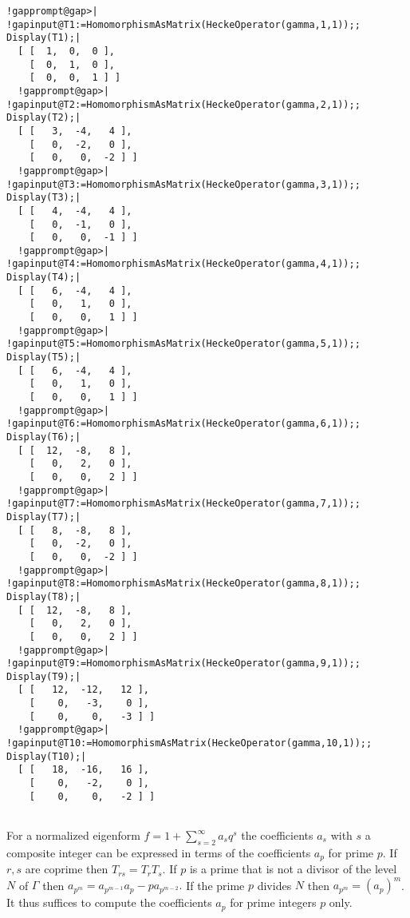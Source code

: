 \documentclass[a4paper,11pt]{report}
\begin{document}
{{\begin{Verbatim}[commandchars=!@|,fontsize=\small,frame=single,label=Example]
  !gapprompt@gap>| !gapinput@T1:=HomomorphismAsMatrix(HeckeOperator(gamma,1,1));; Display(T1);|
  [ [  1,  0,  0 ],
    [  0,  1,  0 ],
    [  0,  0,  1 ] ]
  !gapprompt@gap>| !gapinput@T2:=HomomorphismAsMatrix(HeckeOperator(gamma,2,1));; Display(T2);|
  [ [   3,  -4,   4 ],
    [   0,  -2,   0 ],
    [   0,   0,  -2 ] ]
  !gapprompt@gap>| !gapinput@T3:=HomomorphismAsMatrix(HeckeOperator(gamma,3,1));; Display(T3);|
  [ [   4,  -4,   4 ],
    [   0,  -1,   0 ],
    [   0,   0,  -1 ] ]
  !gapprompt@gap>| !gapinput@T4:=HomomorphismAsMatrix(HeckeOperator(gamma,4,1));; Display(T4);|
  [ [   6,  -4,   4 ],
    [   0,   1,   0 ],
    [   0,   0,   1 ] ]
  !gapprompt@gap>| !gapinput@T5:=HomomorphismAsMatrix(HeckeOperator(gamma,5,1));; Display(T5);|
  [ [   6,  -4,   4 ],
    [   0,   1,   0 ],
    [   0,   0,   1 ] ]
  !gapprompt@gap>| !gapinput@T6:=HomomorphismAsMatrix(HeckeOperator(gamma,6,1));; Display(T6);|
  [ [  12,  -8,   8 ],
    [   0,   2,   0 ],
    [   0,   0,   2 ] ]
  !gapprompt@gap>| !gapinput@T7:=HomomorphismAsMatrix(HeckeOperator(gamma,7,1));; Display(T7);|
  [ [   8,  -8,   8 ],
    [   0,  -2,   0 ],
    [   0,   0,  -2 ] ]
  !gapprompt@gap>| !gapinput@T8:=HomomorphismAsMatrix(HeckeOperator(gamma,8,1));; Display(T8);|
  [ [  12,  -8,   8 ],
    [   0,   2,   0 ],
    [   0,   0,   2 ] ]
  !gapprompt@gap>| !gapinput@T9:=HomomorphismAsMatrix(HeckeOperator(gamma,9,1));; Display(T9);|
  [ [   12,  -12,   12 ],
    [    0,   -3,    0 ],
    [    0,    0,   -3 ] ]
  !gapprompt@gap>| !gapinput@T10:=HomomorphismAsMatrix(HeckeOperator(gamma,10,1));; Display(T10);|
  [ [   18,  -16,   16 ],
    [    0,   -2,    0 ],
    [    0,    0,   -2 ] ]
  
\end{Verbatim}
 

 For a normalized eigenform $f=1 + \sum_{s=2}^\infty a_sq^s$ the coefficients $a_s$ with $s$ a composite integer can be expressed in terms of the coefficients $a_p$ for prime $p$. If $r,s$ are coprime then $T_{rs} =T_rT_s$. If $p$ is a prime that is not a divisor of the level $N$ of $\Gamma$ then $a_{p^m} =a_{p^{m-1}}a_p - p a_{p^{m-2}}.$ If the prime $ p$ divides $N$ then $a_{p^m} = (a_p)^m$. It thus suffices to compute the coefficients $a_p$ for prime integers $p$ only. }

 
}
\end{document}
